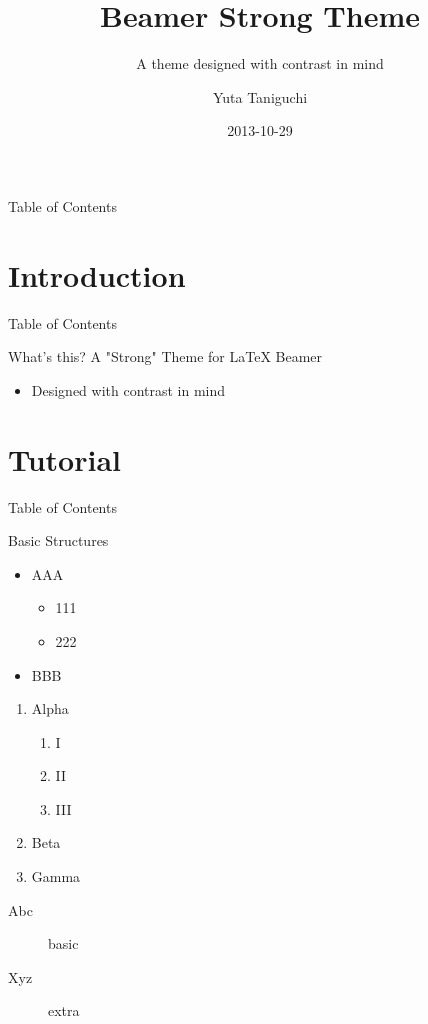 \documentclass[14pt,t,hyperref={pdfencoding=auto}]{beamer}
\title{Beamer Strong Theme}
\subtitle{A theme designed with contrast in mind}
\author{Yuta Taniguchi}
\institute{@yuttieyuttie}
\date{2013-10-29}
\begin{document}
{
  \frame{\titlepage}
}
\setcounter{framenumber}{0}


\begin{frame}{Table of Contents}
  \tableofcontents
\end{frame}


\section{Introduction}
\begin{frame}{Table of Contents}
  \tableofcontents[currentsection]
\end{frame}


\begin{frame}{What's this?}
  A "Strong" Theme for LaTeX Beamer
  \begin{itemize}
  \item Designed with contrast in mind
  \end{itemize}
\end{frame}


\section{Tutorial}
\begin{frame}{Table of Contents}
  \tableofcontents[currentsection]
\end{frame}


\begin{frame}{Basic Structures}
  \begin{itemize}
  \item AAA
    \begin{itemize}
    \item 111
    \item 222
    \end{itemize}
  \item BBB
  \end{itemize}
  \begin{enumerate}
  \item Alpha
    \begin{enumerate}
    \item I
    \item II
    \item III
    \end{enumerate}
  \item Beta
  \item Gamma
  \end{enumerate}
  \begin{description}
  \item[Abc] basic
  \item[Xyz] extra
  \end{description}
\end{frame}
\end{document}

